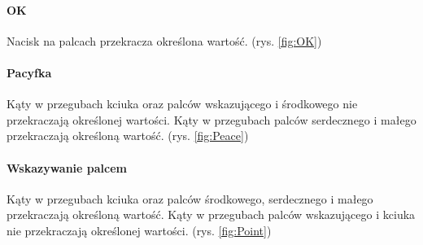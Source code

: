\documentclass[12pt,a4paper]{article}
\begin{document}
\paragraph{OK}
Nacisk na palcach przekracza określona wartość. (rys. \ref{fig:OK})
\paragraph{Pacyfka}
Kąty w przegubach kciuka oraz palców wskazującego i środkowego nie przekraczają określonej wartości. Kąty w przegubach palców serdecznego i małego przekraczają określoną wartość. (rys. \ref{fig:Peace})
\paragraph{Wskazywanie palcem}
Kąty w przegubach kciuka oraz palców środkowego, serdecznego i małego przekraczają określoną wartość. Kąty w przegubach palców wskazującego i kciuka nie przekraczają określonej wartości. (rys. \ref{fig:Point})
\end{document}
